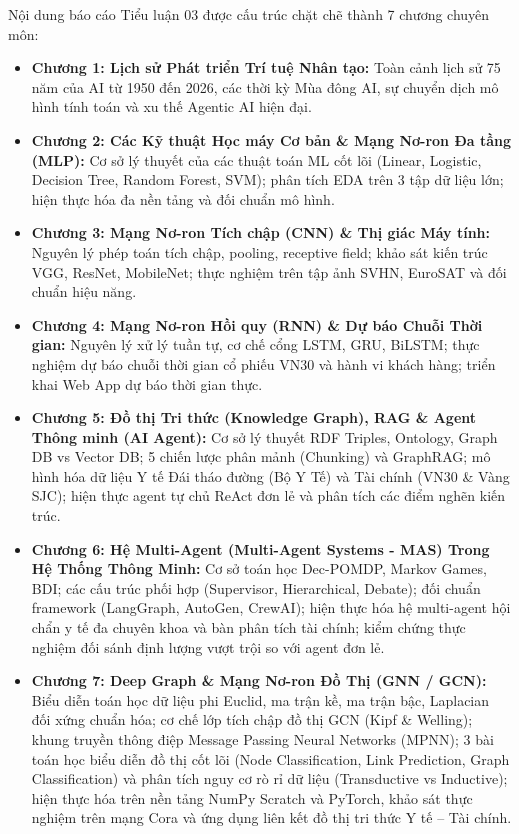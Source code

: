 \documentclass[12pt,a4paper]{report}
\begin{document}
Nội dung báo cáo Tiểu luận 03 được cấu trúc chặt chẽ thành 7 chương chuyên môn:
\begin{itemize}[leftmargin=1.2cm]
    \item \textbf{Chương 1: Lịch sử Phát triển Trí tuệ Nhân tạo:} Toàn cảnh lịch sử 75 năm của AI từ 1950 đến 2026, các thời kỳ Mùa đông AI, sự chuyển dịch mô hình tính toán và xu thế Agentic AI hiện đại.
    \item \textbf{Chương 2: Các Kỹ thuật Học máy Cơ bản \& Mạng Nơ-ron Đa tầng (MLP):} Cơ sở lý thuyết của các thuật toán ML cốt lõi (Linear, Logistic, Decision Tree, Random Forest, SVM); phân tích EDA trên 3 tập dữ liệu lớn; hiện thực hóa đa nền tảng và đối chuẩn mô hình.
    \item \textbf{Chương 3: Mạng Nơ-ron Tích chập (CNN) \& Thị giác Máy tính:} Nguyên lý phép toán tích chập, pooling, receptive field; khảo sát kiến trúc VGG, ResNet, MobileNet; thực nghiệm trên tập ảnh SVHN, EuroSAT và đối chuẩn hiệu năng.
    \item \textbf{Chương 4: Mạng Nơ-ron Hồi quy (RNN) \& Dự báo Chuỗi Thời gian:} Nguyên lý xử lý tuần tự, cơ chế cổng LSTM, GRU, BiLSTM; thực nghiệm dự báo chuỗi thời gian cổ phiếu VN30 và hành vi khách hàng; triển khai Web App dự báo thời gian thực.
    \item \textbf{Chương 5: Đồ thị Tri thức (Knowledge Graph), RAG \& Agent Thông minh (AI Agent):} Cơ sở lý thuyết RDF Triples, Ontology, Graph DB vs Vector DB; 5 chiến lược phân mảnh (Chunking) và GraphRAG; mô hình hóa dữ liệu Y tế Đái tháo đường (Bộ Y Tế) và Tài chính (VN30 \& Vàng SJC); hiện thực agent tự chủ ReAct đơn lẻ và phân tích các điểm nghẽn kiến trúc.
    \item \textbf{Chương 6: Hệ Multi-Agent (Multi-Agent Systems - MAS) Trong Hệ Thống Thông Minh:} Cơ sở toán học Dec-POMDP, Markov Games, BDI; các cấu trúc phối hợp (Supervisor, Hierarchical, Debate); đối chuẩn framework (LangGraph, AutoGen, CrewAI); hiện thực hóa hệ multi-agent hội chẩn y tế đa chuyên khoa và bàn phân tích tài chính; kiểm chứng thực nghiệm đối sánh định lượng vượt trội so với agent đơn lẻ.
    \item \textbf{Chương 7: Deep Graph \& Mạng Nơ-ron Đồ Thị (GNN / GCN):} Biểu diễn toán học dữ liệu phi Euclid, ma trận kề, ma trận bậc, Laplacian đối xứng chuẩn hóa; cơ chế lớp tích chập đồ thị GCN (Kipf \& Welling); khung truyền thông điệp Message Passing Neural Networks (MPNN); 3 bài toán học biểu diễn đồ thị cốt lõi (Node Classification, Link Prediction, Graph Classification) và phân tích nguy cơ rò rỉ dữ liệu (Transductive vs Inductive); hiện thực hóa trên nền tảng NumPy Scratch và PyTorch, khảo sát thực nghiệm trên mạng Cora và ứng dụng liên kết đồ thị tri thức Y tế -- Tài chính.
\end{itemize}
\end{document}
